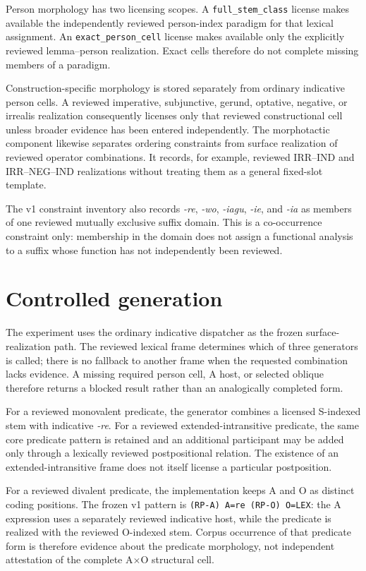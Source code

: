\documentclass[11pt]{article}
\begin{document}
Person morphology has two licensing scopes. A \texttt{full\_stem\_class}
license makes available the independently reviewed person-index paradigm for
that lexical assignment. An \texttt{exact\_person\_cell} license makes
available only the explicitly reviewed lemma--person realization. Exact cells
therefore do not complete missing members of a paradigm.

Construction-specific morphology is stored separately from ordinary indicative
person cells. A reviewed imperative, subjunctive, gerund, optative, negative, or
irrealis realization consequently licenses only that reviewed constructional
cell unless broader evidence has been entered independently. The morphotactic
component likewise separates ordering constraints from surface realization of
reviewed operator combinations. It records, for example, reviewed
IRR--IND and IRR--NEG--IND realizations without treating them as a general
fixed-slot template.

The v1 constraint inventory also records \textit{-re}, \textit{-wo},
\textit{-iagu}, \textit{-ie}, and \textit{-ia} as members of one reviewed
mutually exclusive suffix domain. This is a co-occurrence constraint only:
membership in the domain does not assign a functional analysis to a suffix
whose function has not independently been reviewed.

\section{Controlled generation}
\label{sec:generation}

The experiment uses the ordinary indicative dispatcher as the frozen
surface-realization path. The reviewed lexical frame determines which of three
generators is called; there is no fallback to another frame when the requested
combination lacks evidence. A missing required person cell, A host, or selected
oblique therefore returns a blocked result rather than an analogically completed
form.

For a reviewed monovalent predicate, the generator combines a licensed
S-indexed stem with indicative \textit{-re}. For a reviewed
extended-intransitive predicate, the same core predicate pattern is retained and
an additional participant may be added only through a lexically reviewed
postpositional relation. The existence of an extended-intransitive frame does
not itself license a particular postposition.

For a reviewed divalent predicate, the implementation keeps A and O as distinct
coding positions. The frozen v1 pattern is \texttt{(RP-A) A=re (RP-O) O=LEX}:
the A expression uses a separately reviewed indicative host, while the predicate
is realized with the reviewed O-indexed stem. Corpus occurrence of that
predicate form is therefore evidence about the predicate morphology, not
independent attestation of the complete A$\times$O structural cell.
\end{document}
